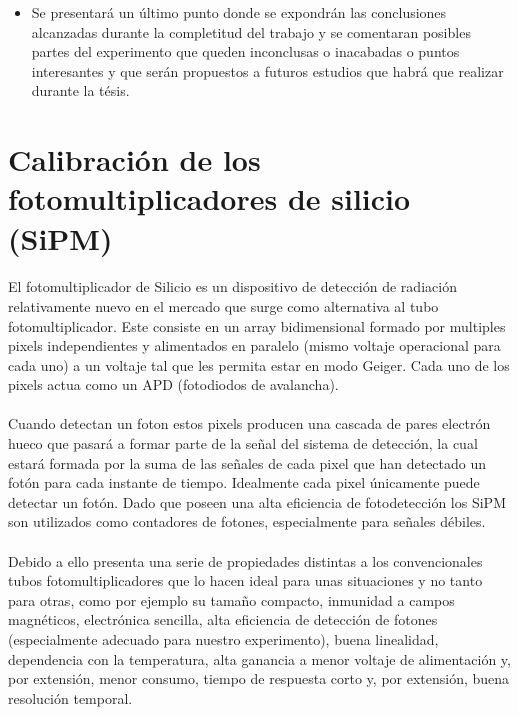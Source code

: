 \documentclass[11pt, a4paper]{article}
\begin{document}
\begin{itemize}
\item{} Se presentará un último punto donde se expondrán las conclusiones alcanzadas durante la completitud del trabajo y se comentaran posibles partes del experimento que queden inconclusas o inacabadas o puntos interesantes y que serán propuestos a futuros estudios que habrá que realizar durante la tésis.
\end{itemize}

\newpage

\section {Calibración de los fotomultiplicadores de silicio (SiPM)}
\paragraph {}
El fotomultiplicador de Silicio es un dispositivo de detección de radiación relativamente nuevo en el mercado que surge como alternativa al tubo fotomultiplicador. Este consiste en un array bidimensional formado por multiples pixels independientes y alimentados en paralelo (mismo voltaje operacional para cada uno) a un voltaje tal que les permita estar en modo Geiger. Cada uno de los pixels actua como un APD (fotodiodos de avalancha).

\paragraph {}
Cuando detectan un foton estos pixels producen una cascada de pares electrón hueco que pasará a formar parte de la señal del sistema de detección, la cual estará formada por la suma de las señales de cada pixel que han detectado un fotón para cada instante de tiempo. Idealmente cada pixel únicamente puede detectar un fotón. Dado que poseen una alta eficiencia de fotodetección los SiPM son utilizados como contadores de fotones, especialmente para señales débiles.

\paragraph {}
Debido a ello presenta una serie de propiedades distintas a los convencionales tubos fotomultiplicadores que lo hacen ideal para unas situaciones y no tanto para otras, como por ejemplo su tamaño compacto, inmunidad a campos magnéticos, electrónica sencilla, alta eficiencia de detección de fotones (especialmente adecuado para nuestro experimento), buena linealidad, dependencia con la temperatura, alta ganancia a menor voltaje de alimentación y, por extensión, menor consumo, tiempo de respuesta corto y, por extensión, buena resolución temporal.
\end{document}
